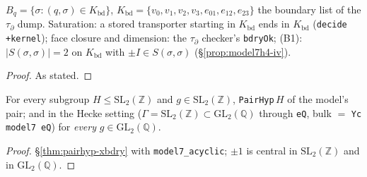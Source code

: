 \begin{definition}\label{def:model7bd}
  \leanok
  $B_q=\{\sigma:(q,\sigma)\in K_{\mathrm{bd}}\}$, $K_{\mathrm{bd}}=\{v_0,v_1,v_2,v_3,e_{01},e_{12},e_{23}\}$ the boundary list of the
  $\tau_\partial$ dump. Saturation: a stored transporter starting in $K_{\mathrm{bd}}$ ends in $K_{\mathrm{bd}}$ (\texttt{decide +kernel});
  face closure and dimension: the $\tau_\partial$ checker's \texttt{bdryOk}; (B1): $|S(\sigma,\sigma)|=2$ on $K_{\mathrm{bd}}$ with
  $\pm I\in S(\sigma,\sigma)$ (\S\ref{prop:model7h4-iv}).
\end{definition}
\begin{proof}
  \leanok
  As stated.
\end{proof}

\begin{theorem}\label{thm:model7-pairhyp}
  \leanok
  For every subgroup $H\le\mathrm{SL}_2(\mathbb Z)$ and $g\in\mathrm{SL}_2(\mathbb Z)$, \texttt{PairHyp}\,$H$ of the model's pair; and in the
  Hecke setting ($\Gamma=\mathrm{SL}_2(\mathbb Z)\subset\mathrm{GL}_2(\mathbb Q)$ through \texttt{eQ}, bulk $=$ \texttt{Yc model7 eQ})
  for \emph{every} $g\in\mathrm{GL}_2(\mathbb Q)$.
\end{theorem}
\begin{proof}
  \leanok
  \S\ref{thm:pairhyp-xbdry} with \texttt{model7\_acyclic}; $\pm1$ is central in $\mathrm{SL}_2(\mathbb Z)$ and in $\mathrm{GL}_2(\mathbb Q)$.
\end{proof}


